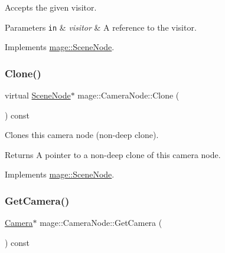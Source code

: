 Accepts the given visitor.


\begin{DoxyParams}[1]{Parameters}
\mbox{\tt in}  & {\em visitor} & A reference to the visitor. \\
\hline
\end{DoxyParams}


Implements \hyperlink{classmage_1_1_scene_node_a35fbfd49185fb61cb4e9edf56af35262}{mage\+::\+Scene\+Node}.

\hypertarget{classmage_1_1_camera_node_adf9a95250d1fd7e6bb9a5850a0aa7817}{}\label{classmage_1_1_camera_node_adf9a95250d1fd7e6bb9a5850a0aa7817} 
\subsubsection{\texorpdfstring{Clone()}{Clone()}}
{\footnotesize\ttfamily virtual \hyperlink{classmage_1_1_scene_node}{Scene\+Node}$\ast$ mage\+::\+Camera\+Node\+::\+Clone (\begin{DoxyParamCaption}{ }\end{DoxyParamCaption}) const\hspace{0.3cm}{\ttfamily [virtual]}}

Clones this camera node (non-\/deep clone).

\begin{DoxyReturn}{Returns}
A pointer to a non-\/deep clone of this camera node. 
\end{DoxyReturn}


Implements \hyperlink{classmage_1_1_scene_node_a85d62213a900cd8e45864b8cde5929e9}{mage\+::\+Scene\+Node}.

\hypertarget{classmage_1_1_camera_node_a7cd05fd41271259870483de5b3ed6ebe}{}\label{classmage_1_1_camera_node_a7cd05fd41271259870483de5b3ed6ebe} 
\subsubsection{\texorpdfstring{Get\+Camera()}{GetCamera()}}
{\footnotesize\ttfamily \hyperlink{classmage_1_1_camera}{Camera}$\ast$ mage\+::\+Camera\+Node\+::\+Get\+Camera (\begin{DoxyParamCaption}{ }\end{DoxyParamCaption}) const}

